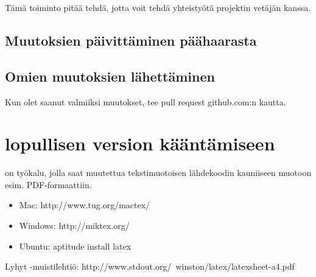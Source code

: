 Tämä toiminto pitää tehdä, jotta voit tehdä yhteistyötä projektin vetäjän kanssa.


\subsection{Muutoksien päivittäminen päähaarasta}


\subsection{Omien muutoksien lähettäminen}


Kun olet saanut valmiiksi muutokset, tee pull request github.com:n kautta.

\section{\latex lopullisen version kääntämiseen}

\latex on työkalu, jolla saat muutettua tekstimuotoisen lähdekoodin kauniiseen muotoon esim. PDF-formaattiin.

\begin{itemize}

\item Mac: http://www.tug.org/mactex/
\item Windows: http://miktex.org/
\item Ubuntu: aptitude install latex

\end{itemize}

Lyhyt \latex -muistilehtiö: http://www.stdout.org/~winston/latex/latexsheet-a4.pdf

